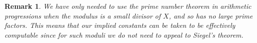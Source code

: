 \documentclass[10pt]{amsart}
\theoremstyle{plain}
\newtheorem*{rmk}{Remark}
\numberwithin{sblmm}{thrm}
\numberwithin{equation}{section}
\begin{document}
%
\begin{rmk}
We have only needed to use the prime number theorem in arithmetic progressions when the modulus is a small divisor of $X$, and so has no large prime factors. This means that our implied constants can be taken to be effectively computable since for such moduli we do not need to appeal to Siegel's theorem.
\end{rmk}

%
%
%
%
\end{document}
